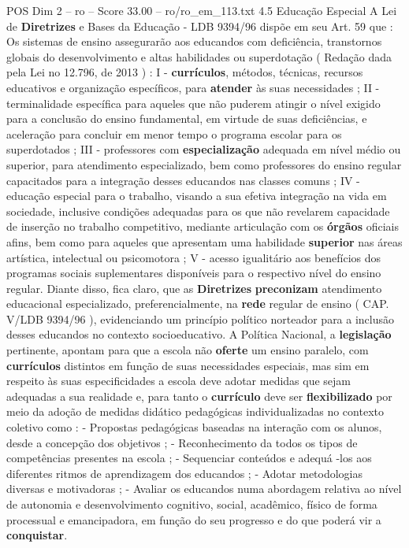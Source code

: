 \begin{textsample}{POS Dim 2 – ro – Score 33.00 – ro/ro\_em\_113.txt}  \label{ex:f2_pos_182}
4.5 Educação Especial A Lei de \textbf{Diretrizes} e Bases da Educação - LDB 9394/96 dispõe em seu Art. 59 que : Os sistemas de ensino assegurarão aos educandos com deficiência, transtornos globais do desenvolvimento e altas habilidades ou superdotação ( Redação dada pela Lei no 12.796, de 2013 ) : I - \textbf{currículos}, métodos, técnicas, recursos educativos e organização específicos, para \textbf{atender} às suas necessidades ; II - terminalidade específica para aqueles que não puderem atingir o nível exigido para a conclusão do ensino fundamental, em virtude de suas deficiências, e aceleração para concluir em menor tempo o programa escolar para os superdotados ; III - professores com \textbf{especialização} adequada em nível médio ou superior, para atendimento especializado, bem como professores do ensino regular capacitados para a integração desses educandos nas classes comuns ; IV - educação especial para o trabalho, visando a sua efetiva integração na vida em sociedade, inclusive condições adequadas para os que não revelarem capacidade de inserção no trabalho competitivo, mediante articulação com os \textbf{órgãos} oficiais afins, bem como para aqueles que apresentam uma habilidade \textbf{superior} nas áreas artística, intelectual ou psicomotora ; V - acesso igualitário aos benefícios dos programas sociais suplementares disponíveis para o respectivo nível do ensino regular.
Diante disso, fica claro, que as \textbf{Diretrizes} \textbf{preconizam} atendimento educacional especializado, preferencialmente, na \textbf{rede} regular de ensino ( CAP.
V/LDB 9394/96 ), evidenciando um princípio político norteador para a inclusão desses educandos no contexto socioeducativo.
A Política Nacional, a \textbf{legislação} pertinente, apontam para que a escola não \textbf{oferte} um ensino paralelo, com \textbf{currículos} distintos em função de suas necessidades especiais, mas sim em respeito às suas especificidades a escola deve adotar medidas que sejam adequadas a sua realidade e, para tanto o \textbf{currículo} deve ser \textbf{flexibilizado} por meio da adoção de medidas didático pedagógicas individualizadas no contexto coletivo como : - Propostas pedagógicas baseadas na interação com os alunos, desde a concepção dos objetivos ; - Reconhecimento da todos os tipos de competências presentes na escola ; - Sequenciar conteúdos e adequá -los aos diferentes ritmos de aprendizagem dos educandos ; - Adotar metodologias diversas e motivadoras ; - Avaliar os educandos numa abordagem relativa ao nível de autonomia e desenvolvimento cognitivo, social, acadêmico, físico de forma processual e emancipadora, em função do seu progresso e do que poderá vir a \textbf{conquistar}.

\end{textsample}
